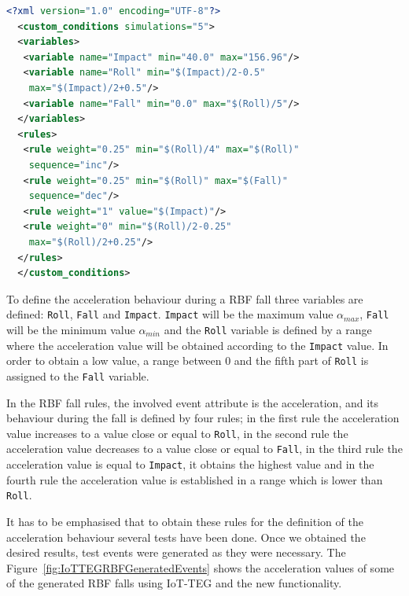 \documentclass[journal]{IEEEtran}
\begin{document}
\begin{lstlisting}[basicstyle=\ttfamily\scriptsize,language=XML,caption={Rules to define a RBF fall},label=RBFFallRules]
  <?xml version="1.0" encoding="UTF-8"?>
  <custom_conditions simulations="5">
  <variables>
   <variable name="Impact" min="40.0" max="156.96"/>
   <variable name="Roll" min="$(Impact)/2-0.5" 
    max="$(Impact)/2+0.5"/>
   <variable name="Fall" min="0.0" max="$(Roll)/5"/>
  </variables>
  <rules>
   <rule weight="0.25" min="$(Roll)/4" max="$(Roll)" 
    sequence="inc"/>
   <rule weight="0.25" min="$(Roll)" max="$(Fall)" 
    sequence="dec"/>
   <rule weight="1" value="$(Impact)"/>
   <rule weight="0" min="$(Roll)/2-0.25" 
    max="$(Roll)/2+0.25"/>
  </rules>
  </custom_conditions>
\end{lstlisting}

To define the acceleration behaviour during a RBF fall three variables are defined: \texttt{\small{Roll}}, 
\texttt{\small{Fall}} and \texttt{\small{Impact}}. \texttt{\small{Impact}} will be the maximum value $\alpha_{max}$, 
\texttt{\small{Fall}} will be the minimum value $\alpha_{min}$ and the \texttt{\small{Roll}} variable is defined by a 
range where the acceleration value will be obtained according to the \texttt{\small{Impact}} value. In order to
obtain a low value, a range between 0 and the fifth part of \texttt{\small{Roll}} is assigned to the \texttt{\small{Fall}} 
variable.

In the RBF fall rules, the involved event attribute is the acceleration, and its behaviour during the 
fall is defined by four rules; in the first rule the acceleration value increases to a value close or equal to \texttt{\small{Roll}},
in the second rule the acceleration value decreases to a value close or equal to \texttt{\small{Fall}}, in the third rule the 
acceleration value is equal to \texttt{\small{Impact}}, it obtains the highest value and in the fourth rule the acceleration value
is established in a range which is lower than \texttt{\small{Roll}}.

It has to be emphasised that to obtain these rules for the definition
of the acceleration behaviour several tests
have been done. Once we obtained the desired results, test events were generated as they were necessary. The 
Figure~\ref{fig:IoTTEGRBFGeneratedEvents} shows the acceleration values of some of the generated RBF falls using
IoT-TEG and the new functionality.
\end{document}
